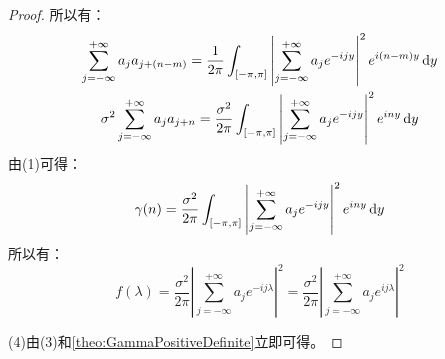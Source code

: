 \begin{proof}
	所以有：
	\begin{gather*}
		\sum_{j=-\infty}^{+\infty}a_ja_{j+(n-m)}=\frac{1}{2\pi}\int_{[-\pi,\pi]}\left|\sum_{j=-\infty}^{+\infty}a_je^{-ijy}\right|^2e^{i(n-m)y}\mathop{}\!\mathrm{d} y \\
		\sigma^2\sum_{j=-\infty}^{+\infty}a_ja_{j+n}=\frac{\sigma^2}{2\pi}\int_{[-\pi,\pi]}\left|\sum_{j=-\infty}^{+\infty}a_je^{-ijy}\right|^2e^{iny}\mathop{}\!\mathrm{d} y
	\end{gather*}
	由(1)可得：
	\begin{equation*}
		\gamma(n)=\frac{\sigma^2}{2\pi}\int_{[-\pi,\pi]}\left|\sum_{j=-\infty}^{+\infty}a_je^{-ijy}\right|^2e^{iny}\mathop{}\!\mathrm{d} y
	\end{equation*}
	所以有：
	\begin{equation*}
		f(\lambda)=\frac{\sigma^2}{2\pi}\left|\sum_{j=-\infty}^{+\infty}a_je^{-ij\lambda}\right|^2=\frac{\sigma^2}{2\pi}\left|\sum_{j=-\infty}^{+\infty}a_je^{ij\lambda}\right|^2
	\end{equation*}\par
	(4)由(3)和\cref{theo:GammaPositiveDefinite}立即可得。
\end{proof}









